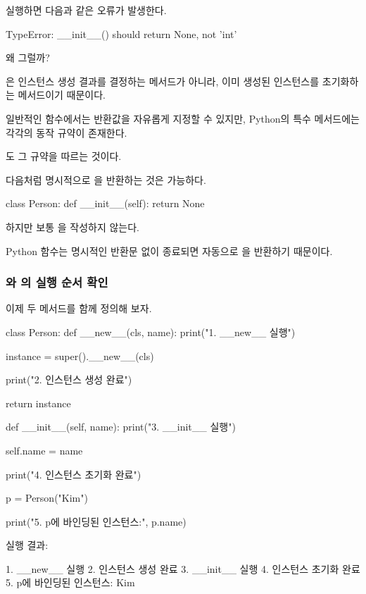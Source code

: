 실행하면 다음과 같은 오류가 발생한다.

\begin{dhkzsh}
TypeError: __init__() should return None, not 'int'
\end{dhkzsh}

왜 그럴까?

은 인스턴스 생성 결과를 결정하는 메서드가 아니라, 이미 생성된 인스턴스를 초기화하는 메서드이기 때문이다.

일반적인 함수에서는 반환값을 자유롭게 지정할 수 있지만, Python의 특수 메서드에는 각각의 동작 규약이 존재한다.

도 그 규약을 따르는 것이다.

다음처럼 명시적으로 을 반환하는 것은 가능하다.

\begin{dhkcode}
class Person:
    def __init__(self):
        return None
\end{dhkcode}

하지만 보통 을 작성하지 않는다.

Python 함수는 명시적인 반환문 없이 종료되면 자동으로 을 반환하기 때문이다.

\subsubsection{와 의 실행 순서 확인}

이제 두 메서드를 함께 정의해 보자.

\begin{dhkcode}
class Person:
    def __new__(cls, name):
        print("1. __new__ 실행")

        instance = super().__new__(cls)

        print("2. 인스턴스 생성 완료")

        return instance

    def __init__(self, name):
        print("3. __init__ 실행")

        self.name = name

        print("4. 인스턴스 초기화 완료")


p = Person("Kim")

print("5. p에 바인딩된 인스턴스:", p.name)
\end{dhkcode}

실행 결과:

\begin{dhkzsh}
1. __new__ 실행
2. 인스턴스 생성 완료
3. __init__ 실행
4. 인스턴스 초기화 완료
5. p에 바인딩된 인스턴스: Kim
\end{dhkzsh}

